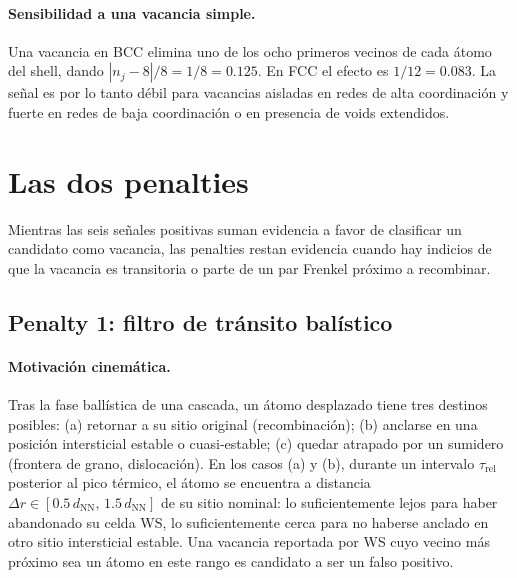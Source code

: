 \documentclass[11pt,a4paper]{article}
\theoremstyle{remark}
\begin{document}
\paragraph{Sensibilidad a una vacancia simple.} Una vacancia en BCC
elimina uno de los ocho primeros vecinos de cada átomo del shell,
dando $|n_j - 8|/8 = 1/8 = 0.125$. En FCC el efecto es
$1/12 = 0.083$. La señal es por lo tanto débil para vacancias
aisladas en redes de alta coordinación y fuerte en redes de baja
coordinación o en presencia de voids extendidos.

\section{Las dos penalties}

Mientras las seis señales positivas suman evidencia a favor de
clasificar un candidato como vacancia, las penalties restan
evidencia cuando hay indicios de que la vacancia es transitoria o
parte de un par Frenkel próximo a recombinar.

\subsection{Penalty 1: filtro de tránsito balístico}
\label{sec:pen-transit}

\paragraph{Motivación cinemática.} Tras la fase ballística de una
cascada, un átomo desplazado tiene tres destinos posibles:
(a) retornar a su sitio original (recombinación);
(b) anclarse en una posición intersticial estable o cuasi-estable;
(c) quedar atrapado por un sumidero (frontera de grano, dislocación).
En los casos (a) y (b), durante un intervalo $\tau_\text{rel}$
posterior al pico térmico, el átomo se encuentra a distancia
$\Delta r \in [0.5\,d_\text{NN},\,1.5\,d_\text{NN}]$ de su sitio
nominal: lo suficientemente lejos para haber abandonado su celda WS,
lo suficientemente cerca para no haberse anclado en otro sitio
intersticial estable. Una vacancia reportada por WS cuyo vecino más
próximo sea un átomo en este rango es candidato a ser un falso
positivo.
\end{document}
